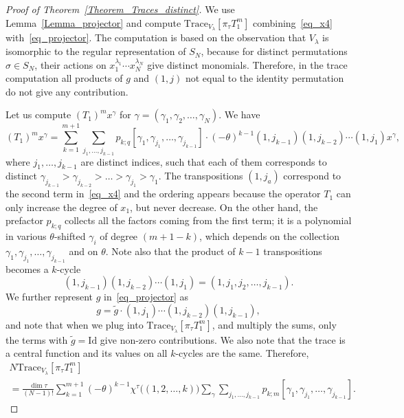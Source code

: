 \documentclass[11pt]{article}
\theoremstyle{definition}
\numberwithin{equation}{section}
\begin{document}
\begin{proof}[Proof of Theorem~\ref{Theorem_Traces_distinct}] We use Lemma~\ref{Lemma_projector} and compute $\mathrm{Trace}_{V_\lambda} \left[\pi_\tau T_1^m\right]$ combining~\eqref{eq_x4} with~\eqref{eq_projector}. The computation is based on the observation that $V_\lambda$ is isomorphic to the regular representation of $S_N$, because for distinct permutations $\sigma\in S_N$, their actions on $x_1^{\lambda_1}\cdots x_N^{\lambda_N}$ give distinct monomials. Therefore, in the trace computation all products of $g$ and $(1,j)$ not equal to the identity permutation do not give any contribution.

Let us compute $(T_1)^m x^{\gamma}$ for $\gamma=(\gamma_1,\gamma_2,\dots,\gamma_N)$.
We have
\begin{equation}
\label{eq_x5}
 (T_1)^m x^{\gamma}=\sum_{k=1}^{m+1}\sum_{j_1,\dots,j_{k-1}} p_{k;q}[\gamma_1,\gamma_{j_1},\dots,\gamma_{j_{k-1}}]\cdot  (-\theta)^{k-1}(1,j_{k-1})(1, j_{k-2})\cdots (1,j_{1}) x^{\gamma},
\end{equation}
where $j_1,\dots,j_{k-1}$ are distinct indices, such that each of them corresponds to distinct $\gamma_{j_{k-1}}>\gamma_{j_{k-2}}>\dots>\gamma_{j_1}>\gamma_1$. The transpositions $(1,j_a)$ correspond to the second term in~\eqref{eq_x4} and the ordering appears because the operator $T_1$ can only increase the degree of $x_1$, but never decrease. On the other hand, the prefactor $p_{k;q}$ collects all the factors coming from the first term; it is a polynomial in various $\theta$-shifted $\gamma_i$ of degree $(m+1-k)$, which depends on the collection $\gamma_1, \gamma_{j_1},\dots,\gamma_{j_{k-1}}$ and on $\theta$. Note also that the product of $k-1$ transpositions becomes a $k$-cycle
$$
 (1,j_{k-1})(1, j_{k-2})\cdots (1,j_{1})=(1, j_{1}, j_{2},\dots, j_{k-1}).
$$
We further represent $g$ in~\eqref{eq_projector} as
$$
 g=\tilde g\cdot  (1,j_1)  \cdots (1,j_{k-2})(1, j_{k-1}),
$$
and note that when we plug into $\mathrm{Trace}_{V_\lambda} \left[\pi_\tau T_1^m\right]$, and multiply the sums, only the terms with $\tilde g=\mathrm{Id}$ give non-zero contributions.
We also note that the trace is a central function and its values on all $k$-cycles are the same. Therefore,
\begin{multline}
\label{eq_x6}
 N \mathrm{Trace}_{V_\lambda} \left[\pi_\tau T_1^m\right]\\ = \frac{\dim \tau}{(N-1)!}  \sum_{k=1}^{m+1} (-\theta)^{k-1} \chi^\tau\bigl( (1,2,\dots,k) \bigr)
 \sum_{\gamma}  \sum_{j_1,\dots,j_{k-1}} p_{k;m}[\gamma_1,\gamma_{j_1},\dots,\gamma_{j_{k-1}}].

\end{multline}
\end{proof}
\end{document}

